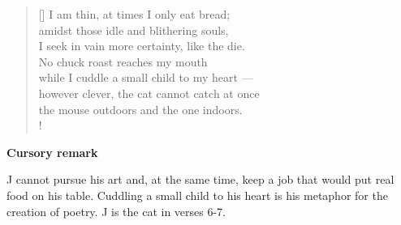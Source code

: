 \documentclass[a4paper,12pt,twoside,final]{book}
\begin{document}

\settowidth{\versewidth}{however clever, the cat cannot catch at once}

\begin{verse}[\versewidth]
  I am thin, at times I only eat bread; \\
  amidst those idle and blithering souls, \\
  I seek in vain more certainty, like the die. \\
  No chuck roast reaches my mouth \\
  while I cuddle a small child to my heart --- \\
  however clever, the cat cannot catch at once \\
  the mouse outdoors and the one indoors. \\!
\end{verse}


\bigskip

\noindent \textbf{Cursory remark}

\medskip

J cannot pursue his art and, at the same time, keep a job that would
put real food on his table. Cuddling a small child to his heart is his
metaphor for the creation of poetry. J is the cat in verses 6-7.

\newpage

\settowidth{\versewidth}{számhoz s szivemhez kisgyerek ---}
\end{document}
